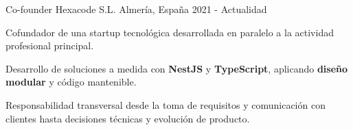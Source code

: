   \cventry
    {Co-founder}
    {Hexacode S.L.}
  {Almería, España}
  {2021 - Actualidad}
  {
    \begin{cvitems}
      \item {Cofundador de una startup tecnológica desarrollada en paralelo a la actividad profesional principal.}
      \item {Desarrollo de soluciones a medida con \textbf{NestJS} y \textbf{TypeScript}, aplicando \textbf{diseño modular} y código mantenible.}
      \item {Responsabilidad transversal desde la toma de requisitos y comunicación con clientes hasta decisiones técnicas y evolución de producto.}
    \end{cvitems}
  }
